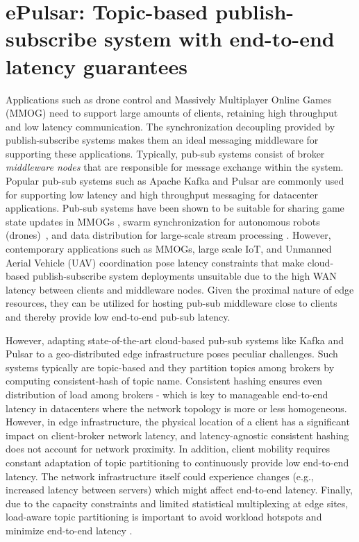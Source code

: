 \chapter{ePulsar: Topic-based publish-subscribe system with end-to-end latency guarantees}
\label{sec:epulsar}

Applications such as drone control and Massively Multiplayer Online Games (MMOG) need to support large amounts of clients, retaining high throughput and low latency communication. The synchronization decoupling provided by publish-subscribe systems \cite{manyfaces, PubSubForMultiplayerGames} makes them an ideal messaging middleware for supporting these applications. Typically, pub-sub systems consist of broker \textit{middleware nodes} that are responsible for message exchange  within the system. Popular pub-sub systems such as Apache Kafka and Pulsar are commonly used for supporting low latency and high throughput messaging for datacenter applications. %
Pub-sub systems have been shown to be suitable for sharing game state updates in MMOGs  \cite{PubSubForMultiplayerGames}, swarm synchronization for autonomous robots (drones)~\cite{flynetsim}, and data distribution for large-scale stream processing \cite{7164934}. However, contemporary applications such as MMOGs, large scale IoT, and Unmanned Aerial Vehicle (UAV) coordination pose latency constraints that make cloud-based publish-subscribe system deployments unsuitable due to the high WAN latency between clients and middleware nodes. Given the proximal nature of edge resources, they can be utilized for hosting pub-sub middleware close to clients and thereby provide low end-to-end pub-sub latency.
\par However, adapting state-of-the-art cloud-based pub-sub systems like Kafka and Pulsar to a geo-distributed edge infrastructure poses peculiar challenges. Such systems typically are topic-based and they partition topics among brokers by computing consistent-hash of topic name. Consistent hashing ensures even distribution of load among brokers - which is key to manageable end-to-end latency in datacenters where the network topology is more or less homogeneous. However, in edge infrastructure, the physical location of a client has a significant impact on client-broker network latency, and latency-agnostic consistent hashing does not account for network proximity. In addition, client mobility requires constant adaptation of topic partitioning to continuously provide low end-to-end latency. The network infrastructure itself could experience changes (e.g., increased latency between servers) which might affect end-to-end latency. Finally, due to the capacity constraints and limited statistical multiplexing at edge sites, load-aware topic partitioning is %
important to avoid workload hotspots and minimize end-to-end latency \cite{khare2018scalable}.

